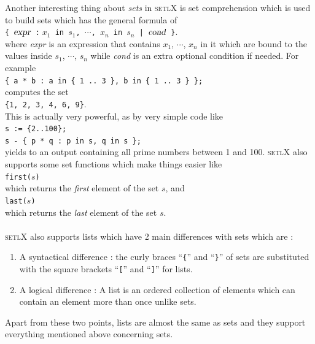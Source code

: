 \documentclass[11pt]{report}
\begin{document}
Another interesting thing about \textsl{sets} in \textsc{setlX} is set comprehension which is used to build sets which has the general formula of
\\[0.2cm]
\hspace*{1.3cm}
\texttt{\{ $\textsl{expr}$ :$\;x_1$ in $s_1$, $\cdots$, $x_n$ in $s_n$ | $\textsl{cond}$ \}}.
\\[0.2cm]
where \textsl{expr} is an expression that contains $x_1$, $\cdots$, $x_n$ in it which are bound to the values inside $s_1$, $\cdots$, $s_n$ while \textsl{cond} is an extra optional condition if needed. For example 
\\[0.2cm]
\hspace*{1.3cm}
\texttt{\{ a * b : a in \{ 1 .. 3 \}, b in \{ 1 .. 3 \} \};}
\\[0.2cm]
computes the set
\\[0.2cm]
\hspace*{1.3cm}
\texttt{\{1, 2, 3, 4, 6, 9\}}.
\\[0.2cm]
This is actually very powerful, as by very simple code like
\\[0.2cm]
\hspace*{1.3cm}
\texttt{s := \{2..100\};}
\\
\hspace*{1.3cm}
\texttt{s - \{ p * q : p in s, q in s \};}
\\[0.2cm]
yields to an output containing all prime numbers between 1 and 100.
\textsc{setlX} also supports some set functions which make things easier like
\\[0.2cm]
\hspace*{1.3cm}
\texttt{first($s$)}
\\[0.2cm]
which returns the \emph{first} element of the set $s$, and
\\[0.2cm]
\hspace*{1.3cm}
\texttt{last($s$)} 
\\[0.2cm]
which returns the \emph{last} element of the set $s$.
\\
\\
\textsc{setlX} also supports lists which have 2 main differences with sets which are :
\begin{enumerate}
\item A syntactical difference : the
curly braces ``\texttt{\{}'' and ``\texttt{\}}'' of sets are substituted with the square brackets
``\texttt{[}'' and ``\texttt{]}'' for lists.
\item A logical difference :  A list is an ordered collection of elements which can contain an element more than once unlike sets.
\end{enumerate} 
Apart from these two points, lists are almost the same as sets and they support everything mentioned above concerning sets.
\\
\end{document}

